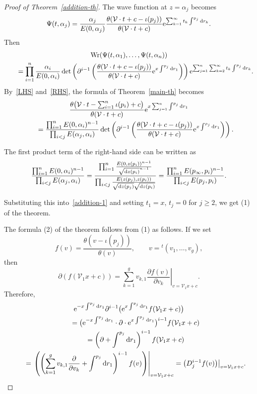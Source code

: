 \documentclass[pdftex]{sigma}
\numberwithin{equation}{section}
\theoremstyle{definition}
\begin{document}
\begin{proof}[Proof of Theorem~\ref{addition-th}]
The wave function at $z=\alpha_j$ becomes
\[
\Psi(t,\alpha_j)=\frac{\alpha_j}{E(0,\alpha_j)}
\frac{\theta({\mathcal V}\cdot t+c-\iota(p_j))}{\theta({\mathcal V}\cdot t+c)}
{\rm e}^{\sum_{k=1}^\infty t_k\int^{p_j} {\rm d}r_k}.
\]
Then
\begin{gather}
\operatorname{Wr}(\Psi(t,\alpha_1),\dots ,\Psi(t,\alpha_n))\nonumber
\\
\qquad=\prod_{i=1}^n\frac{\alpha_i}{E(0,\alpha_i)}
\det\left(
\partial^{i-1}
\left(
\frac{\theta({\mathcal V}\cdot t+c-\iota(p_j))}{\theta({\mathcal V}\cdot t+c)}
{\rm e}^{x\int^{p_j} {\rm d}r_1}
\right)
\right)
{\rm e}^{\sum_{j=1}^n\sum_{k=2}^\infty t_k\int^{p_j} {\rm d}r_k}.
\label{RHS}
\end{gather}
By~\eqref{LHS} and~\eqref{RHS}, the formula of Theorem~\ref{main-th} becomes
\begin{gather}
\frac{\theta\bigl({\mathcal V}\cdot t-\sum_{i=1}^n \iota(p_i)+c\bigr)}{\theta({\mathcal V}\cdot t+c)}
{\rm e}^{x\sum_{j=1}^n\int^{p_j} {\rm d}r_1}
\nonumber
\\
\qquad=
\frac{\prod_{i=1}^n E(0,\alpha_i)^{n-1}}{\prod_{i<j} E(\alpha_j,\alpha_i)}
\det\left(
\partial^{i-1}
\left(
\frac{\theta({\mathcal V}\cdot t+c-\iota(p_j))}{\theta({\mathcal V}\cdot t+c)}
{\rm e}^{x\int^{p_j} {\rm d}r_1}
\right)
\right).
\label{addition-1}
\end{gather}


The first product term of the right-hand side can be written as
\begin{gather*}
\frac{\prod_{i=1}^n E(0,\alpha_i)^{n-1}}{\prod_{i<j} E(\alpha_j,\alpha_i)}
=
\frac{
\prod_{i=1}^n \frac{E(0,z(p_i))^{n-1}}{\sqrt{{\rm d}z(p_i)}^{n-1}}
}
{
\prod_{i<j} \frac{E(z(p_j),z(p_i))}{\sqrt{{\rm d}z(p_j)}\sqrt{{\rm d}z(p_i)}}
}
=
\frac{\prod_{i=1}^n E(p_\infty,p_i)^{n-1}}{\prod_{i<j} E(p_j,p_i)}.
\end{gather*}

Substituting this into~\eqref{addition-1} and setting $t_1=x$, $t_j=0$ for $j\geq 2$, we get (1) of the theorem.

The formula (2) of the theorem follows from (1) as follows.
If we set
\[
f(v)=\frac{\theta(v-\iota(p_j))}{\theta(v)},
\qquad
v={}^t(v_1,\dots ,v_g),
\]
then
\[
\partial ( f({\mathcal V}_1 x+c) )
=\sum_{k=1}^g v_{k,1}\left.\frac{\partial f(v)}{\partial v_{k}}\right|_{v={\mathcal V}_1 x+c}.
\]
Therefore, \begin{gather}
{\rm e}^{-x\int^{p_j} {\rm d}r_1}\partial^{i-1}
\bigl({\rm e}^{x\int^{p_j} {\rm d}r_1} f({\mathcal V}_1 x+c) \bigr)
\nonumber
\\
\qquad=
\bigl({\rm e}^{-x\int^{p_j} {\rm d}r_1}\cdot \partial \cdot {\rm e}^{x\int^{p_j} {\rm d}r_1}\bigr)^{i-1}
f({\mathcal V}_1 x+c)
\nonumber
\\
\qquad=
\left(\partial +\int^{p_j} {\rm d}r_1\right)^{i-1}f({\mathcal V}_1 x+c)
\nonumber
\\
\qquad=\left.\left(\left(\sum_{k=1}^g v_{k,1}\frac{\partial}{\partial v_{k}}+\int^{p_j} {\rm d}r_1\right)^{i-1}
f(v)\right)\right|_{v={\mathcal V}_1 x+c}
=\bigl(D_j^{i-1}f(v)\bigr)\bigr|_{v={\mathcal V}_1 x+c}.
\label{derivative transformation}
\end{gather}


\end{proof}
\end{document}
